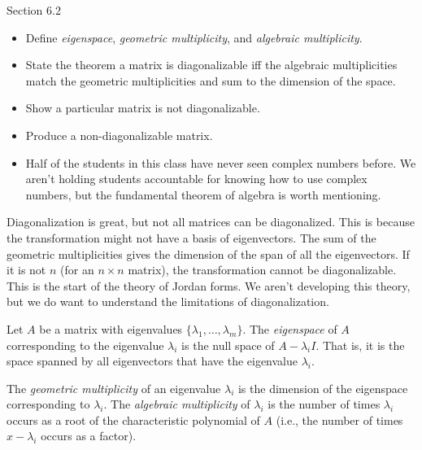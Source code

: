 \documentclass{problemset}
\begin{document}
\begin{lesson}

	Section 6.2

	\begin{itemize}
		\item Define \emph{eigenspace}, \emph{geometric multiplicity}, and \emph{algebraic multiplicity}.
		\item State the theorem a matrix is diagonalizable iff the algebraic multiplicities match the geometric
			multiplicities and sum to the dimension of the space.
		\item Show a particular matrix is not diagonalizable.
		\item Produce a non-diagonalizable matrix.
	\end{itemize}

	\begin{annotation}
		\begin{notes}
			\begin{itemize}
				\item Half of the students in this class have never seen complex
					numbers before. We aren't holding students accountable
					for knowing how to use complex numbers, but the fundamental
					theorem of algebra is worth mentioning.
			\end{itemize}
		\end{notes}
	\end{annotation}
	Diagonalization is great, but not all matrices can be diagonalized. This is because the transformation might not
	have a basis of eigenvectors. The sum of the geometric multiplicities gives the dimension of the span
	of all the eigenvectors. If it is not $n$ (for an $n\times n$ matrix), the transformation cannot be diagonalizable.
	This is the start of the theory of Jordan forms. We aren't developing this theory, but we do want to understand
	the limitations of diagonalization.

\end{lesson}

	\begin{definition}[Eigenspace]
	Let $A$ be a matrix with eigenvalues $\{\lambda_1,\ldots,\lambda_m\}$.  The
	\emph{eigenspace} of $A$ corresponding to the eigenvalue $\lambda_i$ is the
	null space of $A-\lambda_i I$.  That is, it is the space spanned by all eigenvectors
	that have the eigenvalue $\lambda_i$.

	The \emph{geometric multiplicity} of an eigenvalue $\lambda_i$ is the dimension
	of the eigenspace corresponding to $\lambda_i$.  The \emph{algebraic multiplicity}
	of $\lambda_i$ is the number of times $\lambda_i$ occurs as a root of the
	characteristic polynomial of $A$ (i.e., the number of times $x-\lambda_i$
	occurs as a factor).
	\end{definition}
\end{document}
